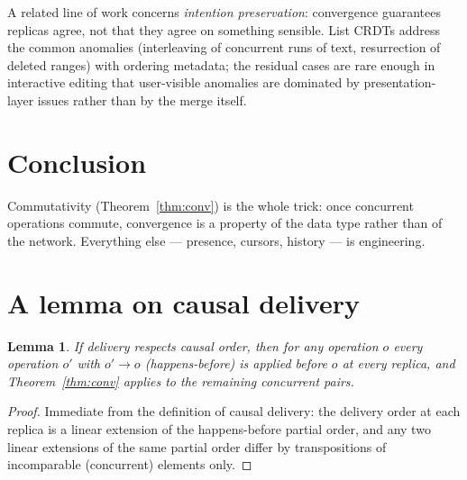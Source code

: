 \documentclass[11pt]{article}
\newtheorem{lemma}{Lemma}
\begin{document}
A related line of work concerns \emph{intention preservation}: convergence
guarantees replicas agree, not that they agree on something sensible. List
CRDTs address the common anomalies (interleaving of concurrent runs of text,
resurrection of deleted ranges) with ordering metadata; the residual cases
are rare enough in interactive editing that user-visible anomalies are
dominated by presentation-layer issues rather than by the merge itself.

\section{Conclusion}

Commutativity (Theorem~\ref{thm:conv}) is the whole trick: once concurrent
operations commute, convergence is a property of the data type rather than of
the network. Everything else — presence, cursors, history — is engineering.

\appendix

\section{A lemma on causal delivery}

\begin{lemma}
If delivery respects causal order, then for any operation $o$ every
operation $o'$ with $o' \rightarrow o$ (happens-before) is applied before
$o$ at every replica, and Theorem~\ref{thm:conv} applies to the remaining
concurrent pairs.
\end{lemma}

\begin{proof}
Immediate from the definition of causal delivery: the delivery order at each
replica is a linear extension of the happens-before partial order, and any
two linear extensions of the same partial order differ by transpositions of
incomparable (concurrent) elements only.
\end{proof}



\end{document}
